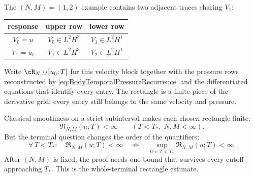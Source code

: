 The \((N,M)=(1,2)\) example contains two adjacent traces sharing \(V_1\):
\begin{center}
\captionsetup{hypcap=false}
\label{tab:FirstAdjacentRectangle}
\renewcommand{\arraystretch}{1.3}
\begin{tabular}{@{}c c c@{}}
\toprule
response & upper row & lower row \\
\midrule
\(V_0=u\) & \(V_0\in L^2H^3\) & \(V_1\in L^2H^1\) \\
\(V_1=u_t\) & \(V_1\in L^2H^3\) & \(V_2\in L^2H^1\) \\
\bottomrule
\end{tabular}
\end{center}

Write \(\cR_{N,M}[u_0;T]\) for this velocity block together with the pressure
rows reconstructed by \eqref{eq:BodyTemporalPressureRecurrence} and the
differentiated equations that identify every entry.  The rectangle is a
finite piece of the derivative grid; every entry still belongs to the same
velocity and pressure.

Classical smoothness on a strict subinterval makes each chosen rectangle
finite:
\begin{equation}\label{eq:StrictSubintervalRectangleBound}
  \mathfrak R_{N,M}(u;T)<\infty
  \qquad(T<T_*,\;N,M<\infty).
\end{equation}
But the terminal question changes the order of the quantifiers:
\[
  \forall\,T<T_*:\quad \mathfrak R_{N,M}(u;T)<\infty
  \quad\not\Longrightarrow\quad
  \sup_{0<T<T_*}\mathfrak R_{N,M}(u;T)<\infty.
\]
After \((N,M)\) is fixed, the proof needs one bound that survives every cutoff
approaching \(T_*\).  This is the whole-terminal rectangle estimate.
